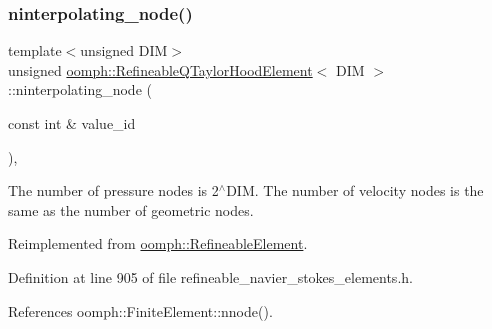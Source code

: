 \mbox{\label{classoomph_1_1RefineableQTaylorHoodElement_a0348c238d8d1bf7afb2532d6f7d1f5a8}} 
\subsubsection{\texorpdfstring{ninterpolating\+\_\+node()}{ninterpolating\_node()}}
{\footnotesize\ttfamily template$<$unsigned D\+IM$>$ \\
unsigned \hyperlink{classoomph_1_1RefineableQTaylorHoodElement}{oomph\+::\+Refineable\+Q\+Taylor\+Hood\+Element}$<$ D\+IM $>$\+::ninterpolating\+\_\+node (\begin{DoxyParamCaption}\item[{const int \&}]{value\+\_\+id }\end{DoxyParamCaption})\hspace{0.3cm}{\ttfamily [inline]}, {\ttfamily [virtual]}}



The number of pressure nodes is 2$^\wedge$\+D\+IM. The number of velocity nodes is the same as the number of geometric nodes. 



Reimplemented from \hyperlink{classoomph_1_1RefineableElement_a8b1b5031b55141567ba24913a21534f4}{oomph\+::\+Refineable\+Element}.



Definition at line 905 of file refineable\+\_\+navier\+\_\+stokes\+\_\+elements.\+h.



References oomph\+::\+Finite\+Element\+::nnode().

\mbox{\label{classoomph_1_1RefineableQTaylorHoodElement_a02da3cfeccf1f235b112db42e0fee9f6}} 
